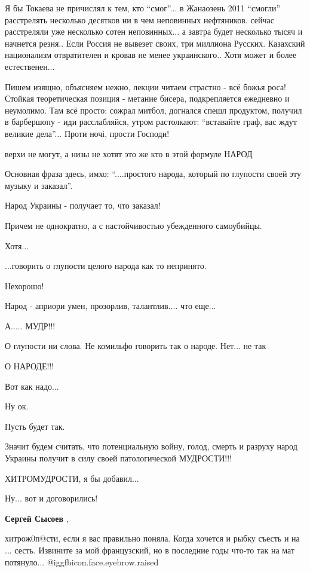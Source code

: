 \begin{itemize}
Я бы Токаева не причислял к тем, кто \enquote{смог}... в Жанаозень 2011 \enquote{смогли}
расстрелять несколько десятков ни в чем неповинных нефтяников. сейчас
расстреляли уже несколько сотен неповинных... а завтра будет несколько тысяч и
начнется резня.. Если Россия не вывезет своих, три миллиона Русских. Казахский
национализм отвратителен и кровав не менее украинского.. Хотя может и более
естественен...


Пишем изящно, объясняем нежно, лекции читаем страстно - всё божья роса! Стойкая
теоретическая позиция - метание бисера, подкрепляется ежедневно и неумолимо.
Там всё просто: сожрал митбол, догнался спешл продуктом, получил в барбершопу -
иди расслабляйся, утром растолкают: \enquote{вставайте граф, вас ждут великие дела}...
Проти ночі, прости Господи!

верхи не могут, а низы не хотят это же кто в этой формуле НАРОД


Основная фраза здесь, имхо: \enquote{....простого народа, который по глупости своей эту
музыку и заказал}.

Народ Украины - получает то, что заказал!

Причем не однократно, а с настойчивостью убежденного самоубийцы.

Хотя...

...говорить о глупости целого народа как то непринято.

Нехорошо!

Народ - априори умен, прозорлив, талантлив.... что еще...

А..... МУДР!!!

О глупости ни слова. Не комильфо говорить так о народе. Нет... не так

О НАРОДЕ!!!

Вот как надо...

Ну ок.

Пусть будет так.

Значит будем считать, что потенциальную войну, голод, смерть и разруху народ
Украины получит в силу своей патологической МУДРОСТИ!!!

ХИТРОМУДРОСТИ, я бы добавил...

Ну... вот и договорились!

\begin{itemize} %
\textbf{Сергей Сысоев} ,

хитрож0п@сти, если я вас правильно поняла. Когда хочется и рыбку съесть и на ...
сесть. Извините за мой французский, но в последние годы что-то так на мат
потянуло... @igg{fbicon.face.eyebrow.raised} 



\end{itemize}
\end{itemize}
